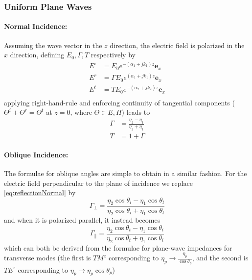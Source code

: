 \documentclass{article}
\numberwithin{equation}{section}
\begin{document}
        \subsubsection*{Uniform Plane Waves}
        \paragraph*{Normal Incidence:}
        Assuming the wave vector in the $z$ direction, the electric field is polarized
        in the $x$ direction, defining $E_0, \Gamma, T$ respectively by
        \begin{subequations} 
            \begin{align*}
                E^i &= E_0 e^{-(\alpha_1 + jk_1) z} \mathbf{e}_x \\
                E^r &= \Gamma E_0 e^{(\alpha_1 + jk_1)z} \mathbf{e}_x \\
                E^t &= T E_0 e^{-(\alpha_2 + jk_2) z} \mathbf{e}_x \\
            \end{align*}
        \end{subequations}
        applying right-hand-rule and enforcing continuity of tangential components
        ($\Theta^i + \Theta^r = \Theta^t$ at $z=0$, where $\Theta \in {E,H}$) leads to 
        \begin{subequations} \label{eq:losslessNormalReflection}
            \begin{align}
                \Gamma &= \frac{\eta_2 - \eta_1}{\eta_2 + \eta_1}
                    \label{eq:reflectionNormal} \\
                T &= 1 + \Gamma
            \end{align}
        \end{subequations}

        \paragraph*{Oblique Incidence:}
        The formulae for oblique angles are simple to obtain in a similar fashion. For
        the electric field perpendicular to the plane of incidence we replace
        \eqref{eq:reflectionNormal} by
        \begin{equation} \label{eq:reflectionObliquePerp}
            \Gamma_{\perp} = \frac{\eta_2 \cos \theta_i - \eta_1 \cos \theta_t }{\eta_2
            \cos \theta_i + \eta_1 \cos \theta_t}
        \end{equation}
        and when it is polarized parallel, it instead becomes
        \begin{equation} \label{eq:reflectionObliquePar}
            \Gamma_{\parallel} = \frac{\eta_2 \cos \theta_t - \eta_1 \cos \theta_i
            }{\eta_2 \cos \theta_t + \eta_1 \cos \theta_i}
        \end{equation}
        which can both be derived from the formulae for plane-wave impedances for
        transverse modes (the first is $TM^z$ corresponding to $\eta_p \to
        \frac{\eta_p}{\cos \theta_p}$, and the second is $TE^z$ corresponding to $\eta_p
        \to \eta_p \cos \theta_p $)
        \newpage       \newpage
\end{document}
